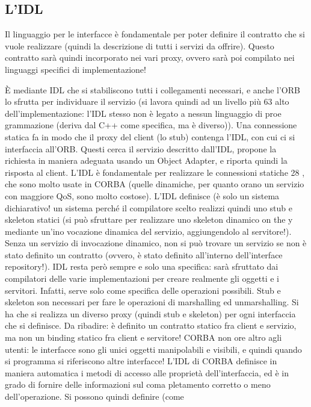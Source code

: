 \subsection{L'IDL}
Il linguaggio per le interfacce è fondamentale per poter definire il contratto che
si vuole realizzare (quindi la descrizione di tutti i servizi da offrire). Questo
contratto sarà quindi incorporato nei vari proxy, ovvero sarà poi compilato nei
linguaggi specifici di implementazione!

È mediante IDL che si stabiliscono tutti i collegamenti necessari, e anche
l'ORB lo sfrutta per individuare il servizio (si lavora quindi ad un livello più
63
alto dell'implementazione: l'IDL stesso non è legato a nessun linguaggio di proe
grammazione (deriva dal C++ come specifica, ma è diverso)). Una connessione
statica fa in modo che il proxy del client (lo stub) contenga l'IDL, con cui ci
si interfaccia all'ORB. Questi cerca il servizio descritto dall'IDL, propone la
richiesta in maniera adeguata usando un Object Adapter, e riporta quindi la
risposta al client.
L'IDL è fondamentale per realizzare le connessioni statiche 28 , che sono molto
usate in CORBA (quelle dinamiche, per quanto orano un servizio con maggiore
QoS, sono molto costose). L'IDL definisce (è solo un sistema dichiarativo! un
sistema perché il compilatore scelto realizzi quindi uno stub e skeleton statici
(si può sfruttare per realizzare uno skeleton dinamico on the y mediante un'ino
vocazione dinamica del servizio, aggiungendolo al servitore!). Senza un servizio
di invocazione dinamico, non si può trovare un servizio se non è stato definito
un contratto (ovvero, è stato definito all'interno dell'interface repository!).
IDL resta però sempre e solo una specifica: sarà sfruttato dai compilatori
delle varie implementazioni per creare realmente gli oggetti e i servitori. Infatti,
serve solo come specifica delle operazioni possibili.
Stub e skeleton son necessari per fare le operazioni di marshalling ed unmarshalling. Si ha che si realizza un diverso
proxy (quindi stub e skeleton) per ogni
interfaccia che si definisce.
Da ribadire: è definito un contratto statico fra client e servizio, ma non un
binding statico fra client e servitore!
CORBA non ore altro agli utenti: le interfacce sono gli unici oggetti manipolabili e visibili, e quindi quando si
programma si riferiscono altre interfacce!
L'IDL di CORBA definisce in maniera automatica i metodi di accesso alle
proprietà dell'interfaccia, ed è in grado di fornire delle informazioni sul coma
pletamento corretto o meno dell'operazione. Si possono quindi definire (come
